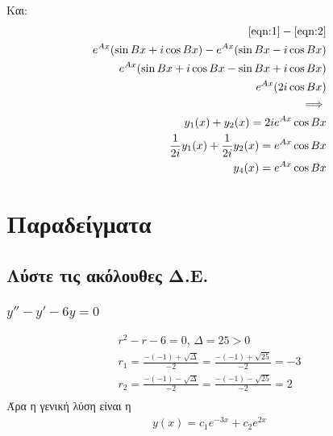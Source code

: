 \documentclass[]{extarticle}
\begin{document}
\begin{multicols*}{2}
    Και:
    \begin{equation*}
        \begin{aligned}
            \eqref{eqn:1} - \eqref{eqn:2}                                     \\
            e^{Ax} (\sin{Bx} + i \cos{Bx}) - e^{Ax} (\sin{Bx} - i \cos{Bx})   \\
            e^{Ax} (\sin{Bx} + i \cos{Bx} - \sin{Bx} + i \cos{Bx})            \\
            e^{Ax} (2 i \cos{Bx})                                             \\ \implies                                      \\
            y_1(x) + y_2(x)                             = 2 i e^{Ax} \cos{Bx} \\
            \frac{1}{2 i} y_1(x) + \frac{1}{2 i} y_2(x) = e^{Ax} \cos{Bx}     \\
            y_4(x)                                      = e^{Ax} \cos{Bx}
        \end{aligned}
    \end{equation*}
    \section{Παραδείγματα}
    \subsection{Λύστε τις ακόλουθες Δ.Ε.}
    \subsubsection{\( y''  -y' - 6y = 0 \)}
    \begin{equation*}
        \begin{aligned}
            r^2 - r - 6 = 0 \text{, } \Delta = 25 > 0                         \\
            r_1 = \frac{-(-1)+\sqrt{Δ}}{-2} = \frac{-(-1)+\sqrt{25}}{-2} = -3 \\
            r_2 = \frac{-(-1)-\sqrt{Δ}}{-2} = \frac{-(-1)-\sqrt{25}}{-2} = 2  \\
        \end{aligned}
    \end{equation*}
    Άρα η γενική λύση είναι η
    \begin{equation*}
        \begin{aligned}
            y(x) = c_1 e^{-3x} + c_2 e^{2x}
        \end{aligned}
    \end{equation*}

\end{multicols*}
\end{document}
